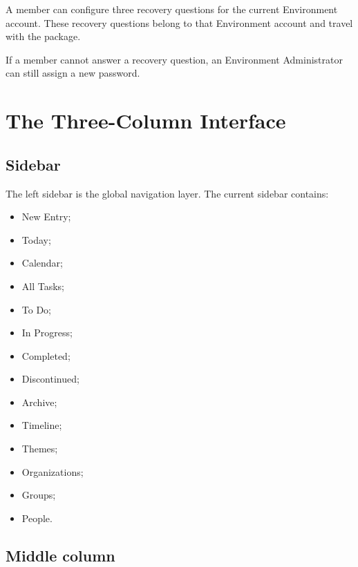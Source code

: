 \documentclass{testudomanual}
\begin{document}
A member can configure three recovery questions for the current Environment account. These recovery questions belong to that Environment account and travel with the  package.

If a member cannot answer a recovery question, an Environment Administrator can still assign a new password.


\chapter{The Three-Column Interface}

\section{Sidebar}

The left sidebar is the global navigation layer. The current sidebar contains:
\begin{itemize}
    \item New Entry;
    \item Today;
    \item Calendar;
    \item All Tasks;
    \item To Do;
    \item In Progress;
    \item Completed;
    \item Discontinued;
    \item Archive;
    \item Timeline;
    \item Themes;
    \item Organizations;
    \item Groups;
    \item People.
\end{itemize}

\section{Middle column}
\end{document}
